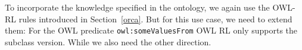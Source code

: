 To incorporate the knowledge specified in the ontology, we again use the OWL-RL rules introduced in Section~\ref{orca}. 
But for this  use case, we need to extend them:
% 
For the OWL predicate \texttt{owl:someValuesFrom}
OWL RL only supports the subclass version. While we also need the other direction.

